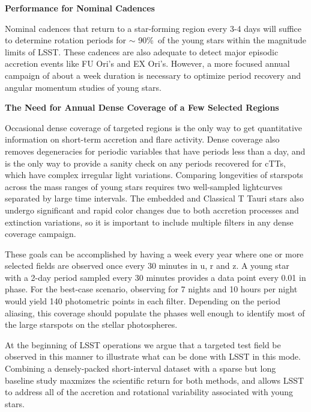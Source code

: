 {\bf Performance for Nominal Cadences}

Nominal cadences that return to a star-forming region every 3-4 days
will suffice to determine rotation periods for $\sim$ 90\%\ of the
young stars within the magnitude limits of LSST.
These cadences are also adequate to detect major episodic
accretion events like FU Ori's and EX Ori's. However, a more focused
annual campaign of about a week duration is necessary to optimize
period recovery and angular momentum studies of young stars.

{\bf The Need for Annual Dense Coverage of a Few Selected Regions}

Occasional dense coverage of targeted regions is the only way to
get quantitative information on short-term accretion and flare
activity.  Dense coverage also removes degeneracies
for periodic variables that have periods less than a day, and is
the only way to provide a sanity check on any periods recovered for
cTTs, which have complex irregular light variations.
Comparing longevities of starspots across the mass ranges of young
stars requires two well-sampled lightcurves separated by large
time intervals.  The embedded and Classical T Tauri stars also undergo
significant and rapid color changes due to both accretion processes
and extinction variations, so it is important
to include multiple filters in any dense coverage campaign.

These goals can be accomplished by having a week every year where
one or more selected fields are observed once every 30 minutes in u, r and z.
A young star with a 2-day period sampled every 30 minutes provides a
data point every 0.01 in phase. For the best-case scenario, observing for 7 nights
and 10 hours per night would yield 140 photometric points in each filter.
Depending on the period aliasing, this coverage should populate the
phases well enough to identify most of the large starspots on the stellar photospheres.

At the beginning of LSST operations we argue that a targeted test field
be observed in this manner to illustrate what can be done with LSST in this mode.
Combining a densely-packed short-interval
dataset with a sparse but long baseline study maxmizes the scientific return
for both methods, and allows LSST to address all of the accretion and
rotational variability associated with young stars.


